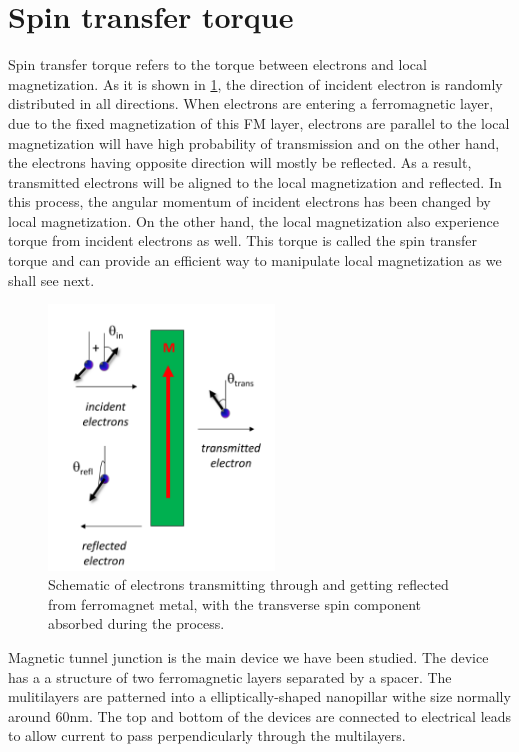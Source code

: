 \section{Spin transfer torque}

Spin transfer torque refers to the torque between electrons and local magnetization. As it is shown in \ref{fig:electron}, the direction of incident electron is randomly distributed in all directions. When electrons are entering a ferromagnetic layer, due to the fixed magnetization of this FM layer, electrons are parallel to the local magnetization will have high probability of transmission and on the other hand, the electrons having opposite direction will mostly be reflected. As a result, transmitted electrons will be aligned to the local magnetization and reflected. In this process, the angular momentum of incident electrons has been changed by local magnetization. On the other hand, the local magnetization also experience torque from incident electrons as well. This torque is called the spin transfer torque\cite{STT} \cite{Currenttorque} and can provide an efficient way to manipulate local magnetization as we shall see next.

\begin{figure}[ht]

  \includegraphics[width=60mm]{fig/electron.png}
  \centering
  \caption{Schematic of electrons transmitting through and getting reflected from ferromagnet metal, with the transverse spin component absorbed during the process.  }
  \label{fig:electron}
\end{figure}

Magnetic tunnel junction is the main device we have been studied. The device has a a structure of two ferromagnetic layers separated by a spacer. The mulitilayers are patterned into a elliptically-shaped nanopillar withe size normally around 60nm. The top and bottom of the devices are connected to electrical leads to allow current to pass perpendicularly through the multilayers.

